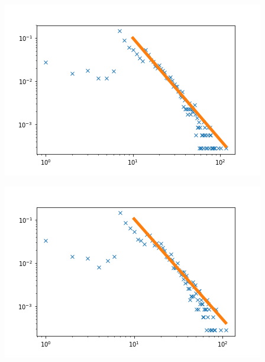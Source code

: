 \documentclass[12pt,twoside]{report}
\begin{document}
\begin{center}
\begin{minipage}{0.45\linewidth}
\includegraphics[width=\linewidth]{figures/degs/1.png}
\end{minipage}%
\hfill
\begin{minipage}{0.45\linewidth}
\includegraphics[width=\linewidth]{figures/degs/3.png}
\end{minipage}
\end{center}
\end{document}
